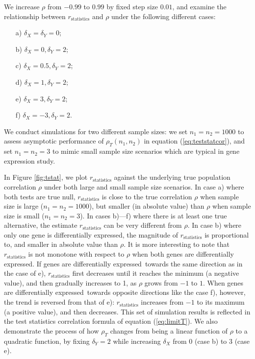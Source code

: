 \documentclass[review]{elsarticle}
\newcommand{\DED}{differentially expressed}
\begin{document}
We increase $\rho$ from $-0.99$ to $0.99$ by fixed step size $0.01$, and examine the 
relationship between $r_\text{statistics}$ and $\rho$ under the following different cases:
\begin{enumerate}
	\item[a)]  $\delta_X = \delta_Y  =0$;
	\item[b)]  $\delta_X = 0, \delta_Y=2$;
	\item[c)]  $\delta_X = 0.5, \delta_Y=2$;
	\item[d)]  $\delta_X = 1, \delta_Y=2$;
	\item[e)]  $\delta_X = 3, \delta_Y=2$;
	\item[f)]  $\delta_X = -3, \delta_Y=2$.
\end{enumerate}

We conduct simulations for two different sample sizes: we set $n_1 = n_2 = 1000$ to assess 
asymptotic performance of $\rho_T(n_1,n_2)$ in equation (\ref{eq:teststatcor}), and set $n_1 = n_2 
= 3$ to mimic small sample size scenarios which are typical in gene expression study. 

In Figure \ref{fig:tstat}, we plot $r_\text{statistics}$ against the 
underlying true population correlation $\rho$ under both large and small sample size scenarios. 
In case a) where both tests are true null, $r_\text{statistics}$ is close to the true 
correlation $\rho$ when sample size is large ($n_1 = n_2 = 1000$), but smaller (in absolute 
value) than $\rho$ when sample size is small ($n_1 = n_2 = 3$).
In cases b)---f) where there is at least one true alternative, the estimate
$r_\text{statistics}$ can be very 
different from $\rho$. In case b) where only one gene is \DED, 
the magnitude of $r_\text{statistics}$ is proportional to, and smaller in absolute value than 
$\rho$.
It is more interesting to note that $r_\text{statistics}$ is not monotone with respect to 
$\rho$ when both genes are \DED. If genes are \DED~towards the same direction as in the case of 
e),  $r_\text{statistics}$ first decreases until it reaches the minimum (a negative value), and 
then gradually increases to 1, as 
$\rho$ grows from $-1$ to $1$. When genes are \DED~towards opposite directions like the case f), 
however, the trend is reversed from that of e): $r_\text{statistics}$ increases from $-1$ to 
its maximum (a positive value), and then decreases. 
This set of simulation results is reflected in the test statistics correlation formula of 
equation (\ref{eq:limitT}). We also demonstrate the process of how $\rho_T$ changes from
being a linear function of $\rho$ to a quadratic function, by fixing $\delta_Y=2$ while 
increasing $\delta_X$ from $0$ (case b) to $3$ (case e).
\end{document}
